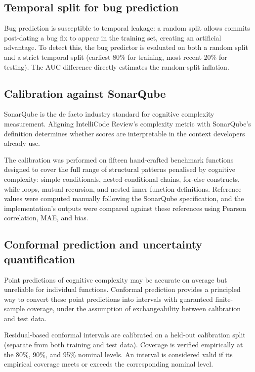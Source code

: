 \documentclass[12pt, oneside]{report}
\begin{document}
\subsection{Temporal split for bug prediction}

Bug prediction is susceptible to temporal leakage: a random split allows commits post-dating a bug fix to appear in the training set, creating an artificial advantage. To detect this, the bug predictor is evaluated on both a random split and a strict temporal split (earliest 80\% for training, most recent 20\% for testing). The AUC difference directly estimates the random-split inflation.

\subsection{Calibration against SonarQube}
\label{ssec:sonarqube-cal}

SonarQube is the de facto industry standard for cognitive complexity measurement. Aligning IntelliCode Review's complexity metric with SonarQube's definition determines whether scores are interpretable in the context developers already use.

The calibration was performed on fifteen hand-crafted benchmark functions designed to
cover the full range of structural patterns penalised by cognitive complexity: simple
conditionals, nested conditional chains, for-else constructs, while loops, mutual
recursion, and nested inner function definitions. Reference values were computed
manually following the SonarQube specification, and the implementation's outputs were
compared against these references using Pearson correlation, MAE, and bias.

\subsection{Conformal prediction and uncertainty quantification}

Point predictions of cognitive complexity may be accurate on average but unreliable
for individual functions. Conformal prediction provides a principled way to convert
these point predictions into intervals with guaranteed finite-sample coverage, under
the assumption of exchangeability between calibration and test data.

Residual-based conformal intervals are calibrated on a held-out calibration split
(separate from both training and test data). Coverage is verified empirically at the
80\%, 90\%, and 95\% nominal levels. An interval is considered valid if its empirical
coverage meets or exceeds the corresponding nominal level.
\end{document}
